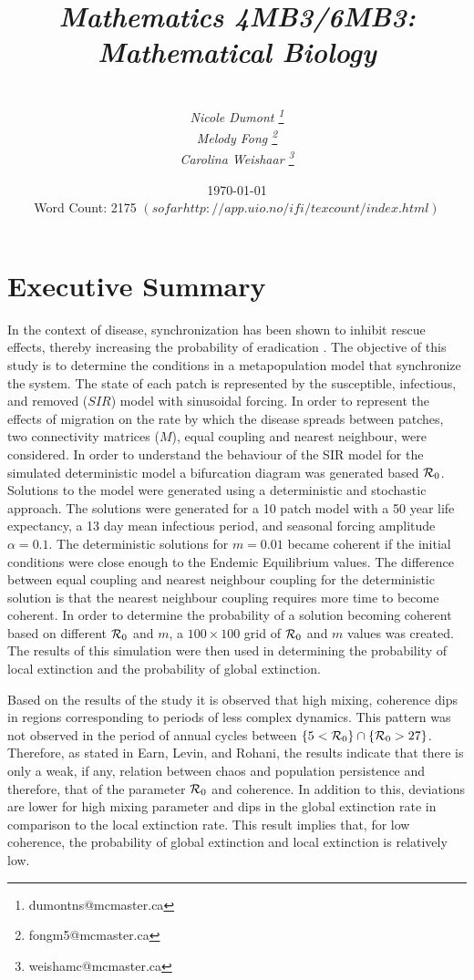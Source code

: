 \documentclass[twocolumn,nofootinbib,showkeys,twoside,floatfix,unsortedaddress,flushbottom,10pt,aps,pra]{report}
\author{\sc{\bfseries Model Students:}\\
\small \emph{Nicole Dumont \footnote{dumontns@mcmaster.ca}} \\
 \small \emph{Melody Fong \footnote{fongm5@mcmaster.ca}} \\
 \small  \emph{Carolina Weishaar \footnote{weishamc@mcmaster.ca}}}
\title{ \small \emph{Mathematics 4MB3/6MB3: Mathematical Biology }\\
  \Huge \sc{\bfseries Spatial Epidemics Dynamics:\\ Synchronization}}
\date{\today \\
  Word Count: 2175 $(so far http://app.uio.no/ifi/texcount/index.html)$}
\begin{document}
\pagestyle{fancy}

\maketitle
\tableofcontents

\onecolumn
\section*{\Huge Executive Summary}

In the context of disease, synchronization has been shown to inhibit rescue effects, thereby increasing the probability of eradication  \cite{McCluskey2011}. The objective of this study is to determine the conditions in a metapopulation model that synchronize the system. The state of each patch is represented by the susceptible, infectious, and removed ($SIR$) model with sinusoidal forcing. In order to represent the effects of migration on the rate by which the disease spreads between patches, two connectivity matrices ($M$), equal coupling and nearest neighbour, were considered. In order to understand the behaviour of the SIR model for the simulated deterministic model a bifurcation diagram was generated based ${\cal R}_0$. Solutions to the model were generated using a deterministic and stochastic approach. The solutions were generated for a 10 patch model with a 50 year life expectancy, a 13 day mean infectious period, and seasonal forcing amplitude $\alpha = 0.1$. The deterministic solutions for $m=0.01$ became coherent if the initial conditions were close enough to the Endemic Equilibrium values. The difference between equal coupling and nearest neighbour coupling for the deterministic solution is that the nearest neighbour coupling requires more time to become coherent. In order to determine the probability of a solution becoming coherent based on different ${\cal R}_0$ and $m$, a $100\times100$ grid of ${\cal R}_0$ and $m$ values was created.  The results of this simulation were then used in determining the probability of local extinction and the probability of global extinction. 
\par
\smallskip \qquad
Based on the results of the study it is observed that high mixing, coherence dips in regions corresponding to periods of less complex dynamics. This pattern was not observed in the period of annual cycles between $\{5<{\cal R}_0\}\cap\{{\cal R}_0>27\}$. Therefore, as stated in Earn, Levin, and Rohani, the results indicate that there is only a weak, if any, relation between chaos and population persistence\cite{Earn2000} and therefore, that of the parameter ${\cal R}_0$ and coherence. In addition to this, deviations are lower for high mixing parameter and dips in the global extinction rate in comparison to the local extinction rate. This result implies that, for low coherence, the probability of global extinction and local extinction is relatively low.
\end{document}

